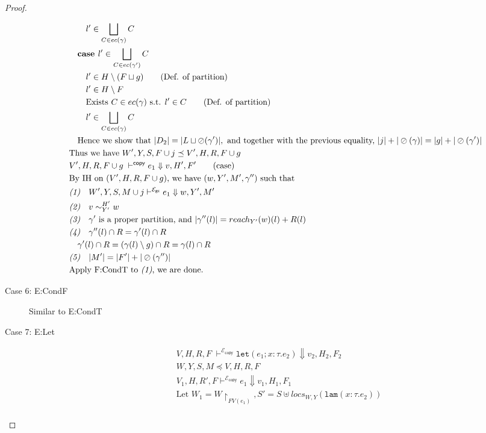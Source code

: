 \documentclass{easychair}
\newcommand{\ms}[1]{\ensuremath{\mathsf{#1}}}
\newcommand{\irl}[1]{\mathtt{#1}}
\newcommand{\veq}[4]{#3 \sim^{#1}_{#2} #4}
\newcommand{\oh}[1]{\oslash(#1)}
\newcommand{\gcSem}{\ensuremath{\mathcal{E}_{\ms{gc}}}}
\newcommand{\copySem}{\ensuremath{\mathcal{E}_{\ms{copy}}}}
\theoremstyle{definition}
\begin{document}
\begin{proof}
\begin{description}
\begin{align*}
		&\quad\quad l' \in \bigsqcup_{C \in ec(\gamma)} C\\
		&\quad\textbf{case } l' \in \bigsqcup_{C \in ec(\gamma')} C\\
		&\quad\quad l' \in H \setminus (F \sqcup g) \tag{Def. of partition}\\
		&\quad\quad l' \in H \setminus F \\
		&\quad\quad \text{Exists } C \in ec(\gamma) \text{ s.t. } l' \in C \tag{Def. of partition}\\
		&\quad\quad l' \in \bigsqcup_{C \in ec(\gamma)} C\\
		&\quad\text{Hence we show that } |D_2| = |L \sqcup \oh{\gamma'}|, \text{ and together with the previous 
		equality, } |j| + |\oh{\gamma}| = |g| + |\oh{\gamma'}|\\
		&\text{Thus we have } W',Y,S,F \cup j \preceq V',H,R,F \cup g\\
  	&V',H,R,F \cup g\; \vdash^{\mathsf{copy}} e_1 \Downarrow v, H',F' \tag{case}\\
		&\text{By IH on $(V',H,R,F\cup g)$, we have } (w,Y',M',\gamma'') \text{ such that }\\
		&\emph{(1)}\quad  W',Y,S,M \cup j  \vdash^{\gcSem} e_1 \Downarrow w,Y',M'\\
		&\emph{(2)}\quad \veq{H'}{Y'}{v}{w}\\
		&\emph{(3)}\quad \gamma' \text{ is a proper partition, and } |\gamma''(l)| = 
			reach_{Y'}(w)(l) + R(l)\\
		&\emph{(4)}\quad \gamma''(l) \cap R = \gamma'(l) \cap R \\
		&\quad \gamma'(l) \cap R = (\gamma(l) \setminus g) \cap R= \gamma(l) \cap R\\
		&\emph{(5)}\quad |M'| = |F'| + |\oh{\gamma''}|\\
		&\text{Apply F:CondT to \emph{(1)}, we are done.}
  \end{align*}
  \item[Case 6: E:CondF] 
  Similar to E:CondT
  \item[Case 7: E:Let]
  \begin{align*}
		&V,H,R,F \; \vdash^{\copySem} \irl{let}(e_1; x : \tau.e_2) \Downarrow v_2,H_2,F_2 \tag{case}\\
		&W,Y,S,M \preceq V,H,R,F \tag{assumption}\\
		&V_1,H,R',F \vdash^{\copySem} e_1 \Downarrow v_1,H_1,F_1 \tag{admissibility}\\
		&\text{Let } W_1 = W \restriction_{FV(e_1)}, S' = S \uplus locs_{W,Y}(\irl{lam}(x : \tau.e_2))\\

\end{align*}
\end{description}
\end{proof}
\end{document}
